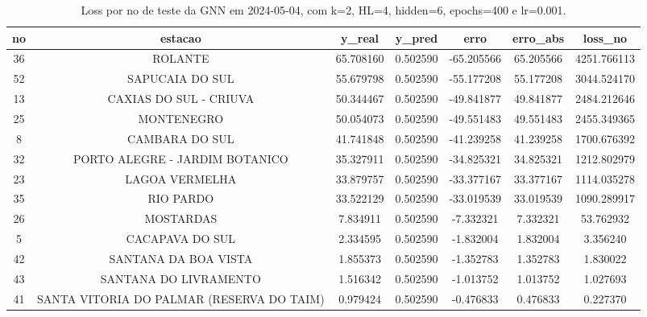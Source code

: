 \begin{table}[h]
\centering
\caption{Loss por no de teste da GNN em 2024-05-04, com k=2, HL=4, hidden=6, epochs=400 e lr=0.001.}
\label{tab:gnn_loss_k2_hl4_h6_e400_d20240504}
\begin{tabular}{ccccccc}
\toprule
no & estacao & y\_real & y\_pred & erro & erro\_abs & loss\_no \\
\midrule
36 & ROLANTE & 65.708160 & 0.502590 & -65.205566 & 65.205566 & 4251.766113 \\
52 & SAPUCAIA DO SUL & 55.679798 & 0.502590 & -55.177208 & 55.177208 & 3044.524170 \\
13 & CAXIAS DO SUL - CRIUVA & 50.344467 & 0.502590 & -49.841877 & 49.841877 & 2484.212646 \\
25 & MONTENEGRO & 50.054073 & 0.502590 & -49.551483 & 49.551483 & 2455.349365 \\
8 & CAMBARA DO SUL & 41.741848 & 0.502590 & -41.239258 & 41.239258 & 1700.676392 \\
32 & PORTO ALEGRE - JARDIM BOTANICO & 35.327911 & 0.502590 & -34.825321 & 34.825321 & 1212.802979 \\
23 & LAGOA VERMELHA & 33.879757 & 0.502590 & -33.377167 & 33.377167 & 1114.035278 \\
35 & RIO PARDO & 33.522129 & 0.502590 & -33.019539 & 33.019539 & 1090.289917 \\
26 & MOSTARDAS & 7.834911 & 0.502590 & -7.332321 & 7.332321 & 53.762932 \\
5 & CACAPAVA DO SUL & 2.334595 & 0.502590 & -1.832004 & 1.832004 & 3.356240 \\
42 & SANTANA DA BOA VISTA & 1.855373 & 0.502590 & -1.352783 & 1.352783 & 1.830022 \\
43 & SANTANA DO LIVRAMENTO & 1.516342 & 0.502590 & -1.013752 & 1.013752 & 1.027693 \\
41 & SANTA VITORIA DO PALMAR (RESERVA DO TAIM) & 0.979424 & 0.502590 & -0.476833 & 0.476833 & 0.227370 \\
\bottomrule
\end{tabular}
\end{table}
